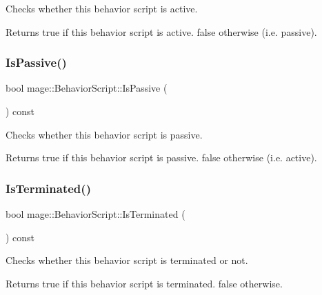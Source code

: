 Checks whether this behavior script is active.

\begin{DoxyReturn}{Returns}
{\ttfamily true} if this behavior script is active. {\ttfamily false} otherwise (i.\+e. passive). 
\end{DoxyReturn}
\hypertarget{classmage_1_1_behavior_script_a40e33539ca7013a13ef127af11bff3e1}{}\label{classmage_1_1_behavior_script_a40e33539ca7013a13ef127af11bff3e1} 
\subsubsection{\texorpdfstring{Is\+Passive()}{IsPassive()}}
{\footnotesize\ttfamily bool mage\+::\+Behavior\+Script\+::\+Is\+Passive (\begin{DoxyParamCaption}{ }\end{DoxyParamCaption}) const\hspace{0.3cm}{\ttfamily [noexcept]}}

Checks whether this behavior script is passive.

\begin{DoxyReturn}{Returns}
{\ttfamily true} if this behavior script is passive. {\ttfamily false} otherwise (i.\+e. active). 
\end{DoxyReturn}
\hypertarget{classmage_1_1_behavior_script_abb1625dbaa3b1145009ea474b082938f}{}\label{classmage_1_1_behavior_script_abb1625dbaa3b1145009ea474b082938f} 
\subsubsection{\texorpdfstring{Is\+Terminated()}{IsTerminated()}}
{\footnotesize\ttfamily bool mage\+::\+Behavior\+Script\+::\+Is\+Terminated (\begin{DoxyParamCaption}{ }\end{DoxyParamCaption}) const\hspace{0.3cm}{\ttfamily [noexcept]}}

Checks whether this behavior script is terminated or not.

\begin{DoxyReturn}{Returns}
{\ttfamily true} if this behavior script is terminated. {\ttfamily false} otherwise. 
\end{DoxyReturn}
\hypertarget{classmage_1_1_behavior_script_a17703fd980599ccf7265b5ffc6148fe8}{}\label{classmage_1_1_behavior_script_a17703fd980599ccf7265b5ffc6148fe8} 
